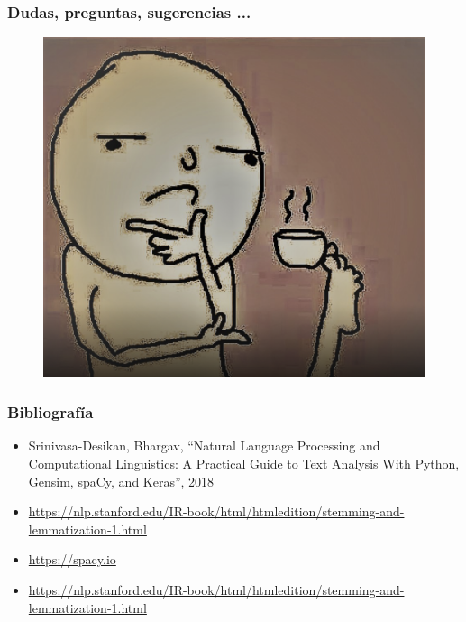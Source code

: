 \documentclass[
10pt, %
aspectratio=169, %
]{beamer}
\begin{document}
	
	\begin{frame}
		
		\frametitle{Dudas, preguntas, sugerencias ...}
		
		\begin{figure}[h]
			\centering
			\includegraphics[scale=0.38]{duda.png}
		\end{figure}
		
	\end{frame}
	
	
	\begin{frame}
		
		\frametitle{Bibliografía}
		
		\begin{itemize}
			
			\item Srinivasa-Desikan, Bhargav, ``Natural Language Processing and Computational Linguistics: A Practical Guide to Text Analysis With Python, Gensim, spaCy, and Keras'', 2018			
			
			\item \url{https://nlp.stanford.edu/IR-book/html/htmledition/stemming-and-lemmatization-1.html}
			
			\item \url{https://spacy.io}
			
			\item \url{https://nlp.stanford.edu/IR-book/html/htmledition/stemming-and-lemmatization-1.html}
			
		\end{itemize}
		
	\end{frame}
	
	
	\begin{frame}
		\titlepage
	\end{frame}
	
	
	
\end{document}
